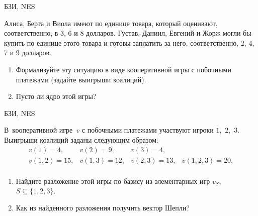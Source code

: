 \begin{problem} \begin{source}
БЗИ, NES
\end{source} Алиса, Берта и Виола имеют по
единице товара, который оценивают, соответственно, в 3, 6 и
8 долларов. Густав, Даниил, Евгений и Жорж могли бы купить
по единице этого товара и готовы заплатить за него,
соответственно, 2, 4, 7 и 9 долларов.
\begin{enumerate}
  \item Формализуйте эту ситуацию в виде кооперативной игры с
  побочными платежами (задайте выигрыши коалиций).
  \item Пусто ли ядро этой игры?
\end{enumerate}







\begin{sol}

\end{sol}
\end{problem}




\begin{problem} \begin{source}
БЗИ, NES
\end{source}
В~кооперативной игре~$v$ с побочными платежами участвуют
игроки $1$,~$2$,~$3$. Выигрыши коалиций заданы следующим
образом:
\[\begin{array}{llll}
  v(1)=4,&v(2)=9,&v(3)=4,\\
  v(1,2)=15,&v(1,3)=12,&v(2,3)=13,&v(1,2,3)=20.\\
\end{array}\]
\begin{enumerate}
  \item Найдите разложение этой игры по базису из элементарных игр
  $v_S$, $S\subseteq\{1,2,3\}$.
  \item Как из найденного разложения получить вектор Шепли?
\end{enumerate}







\begin{sol}

\end{sol}
\end{problem}



